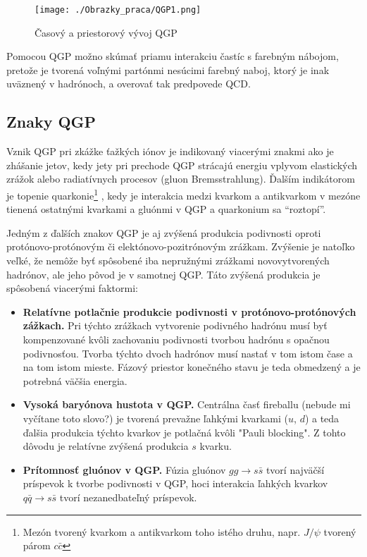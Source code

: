 \documentclass[thesismargins, thesislinespacing]{rnthesis}
\begin{document}
\begin{figure}[hbtp!]
	\begin{center}
		\texttt{[image: ./Obrazky\_praca/QGP1.png]}
		\caption{ Časový a priestorový vývoj QGP \cite{vyvoj}}
		\label{QGP}
	\end{center}
\end{figure}  

Pomocou QGP možno skúmať priamu interakciu častíc s  farebným nábojom, pretože je tvorená voľnými partónmi nesúcimi farebný naboj, ktorý je inak uväznený v hadrónoch, a overovať tak predpovede QCD. 

\subsection{Znaky QGP} 

Vznik QGP pri zkážke ťažkých iónov je indikovaný viacerými znakmi ako je zhášanie jetov, kedy jety pri prechode QGP strácajú energiu vplyvom elastických zrážok alebo radiatívnych procesov (gluon Bremsstrahlung). Ďalším indikátorom je topenie quarkonie\footnote{Mezón tvorený kvarkom a antikvarkom toho istého druhu, napr. $J/ \psi$ tvorený párom $c \bar{c}$ } , kedy je interakcia medzi kvarkom a antikvarkom v mezóne tienená ostatnými kvarkami a gluónmi v QGP a quarkonium sa “roztopí”. 

Jedným z ďalších znakov QGP je aj zvýšená produkcia podivnosti oproti protónovo-protónovým či elektónovo-pozitrónovým zrážkam. Zvýšenie je natoľko veľké, že nemôže byť spôsobené iba nepružnými zrážkami novovytvorených hadrónov, ale jeho pôvod je v samotnej QGP. Táto zvýšená produkcia je spôsobená viacerými faktormi:
\begin{itemize}
	\item \textbf{Relatívne potlačnie produkcie podivnosti v protónovo-protónových zážkach.} Pri týchto zrážkach vytvorenie podivného hadrónu musí byť kompenzované kvôli zachovaniu podivnosti tvorbou hadrónu s opačnou podivnosťou. Tvorba týchto dvoch hadrónov musí nastať v tom istom čase a na tom istom mieste.  Fázový priestor konečného stavu je teda obmedzený a je potrebná väčšia energia.
	\item \textbf{Vysoká baryónova hustota v QGP.} Centrálna časť fireballu (nebude mi vyčítane toto slovo?) je tvorená prevažne ľahkými kvarkami ($u$, $d$) a teda ďalšia produkcia týchto kvarkov je potlačná kvôli  "Pauli blocking". Z tohto dôvodu je relatívne zvýšená produkcia $s$ kvarku.
	\item \textbf{Prítomnosť gluónov v QGP.} Fúzia gluónov $gg\rightarrow s \bar{s}$ tvorí najväčší príspevok k tvorbe podivnosti v QGP, hoci interakcia ľahkých kvarkov $q \bar{q} \rightarrow s \bar{s}$ tvorí nezanedbateľný príspevok.
\end{itemize}
\end{document}
